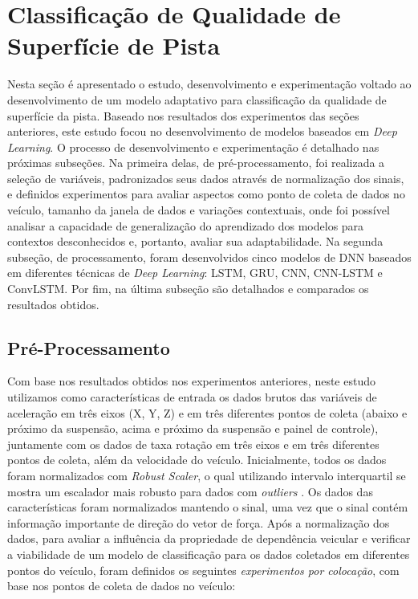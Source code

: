 \chapter{Classificação de Qualidade de Superfície de Pista}
\label{cap:classificacao_qualidade}

Nesta seção é apresentado o estudo, desenvolvimento e experimentação voltado ao desenvolvimento de um modelo adaptativo para classificação da qualidade de superfície da pista. Baseado nos resultados dos experimentos das seções anteriores, este estudo focou no desenvolvimento de modelos baseados em \textit{Deep Learning}. O processo de desenvolvimento e experimentação é detalhado nas próximas subseções. Na primeira delas, de pré-processamento, foi realizada a seleção de variáveis, padronizados seus dados através de normalização dos sinais, e definidos experimentos para avaliar aspectos como ponto de coleta de dados no veículo, tamanho da janela de dados e variações contextuais, onde foi possível analisar a capacidade de generalização do aprendizado dos modelos para contextos desconhecidos e, portanto, avaliar sua adaptabilidade. Na segunda subseção, de processamento, foram desenvolvidos cinco modelos de DNN baseados em diferentes técnicas de \textit{Deep Learning}: LSTM, GRU, CNN, CNN-LSTM e ConvLSTM. Por fim, na última subseção são detalhados e comparados os resultados obtidos.

\section{Pré-Processamento}

Com base nos resultados obtidos nos experimentos anteriores, neste estudo utilizamos como características de entrada os dados brutos das variáveis de aceleração em três eixos (X, Y, Z) e em três diferentes pontos de coleta (abaixo e próximo da suspensão, acima e próximo da suspensão e painel de controle), juntamente com os dados de taxa rotação em três eixos e em três diferentes pontos de coleta, além da velocidade do veículo. Inicialmente, todos os dados foram normalizados com \textit{Robust Scaler}, o qual utilizando intervalo interquartil se mostra um escalador mais robusto para dados com \textit{outliers} \cite{Vaitheeshwari2019}. Os dados das características foram normalizados mantendo o sinal, uma vez que o sinal contém informação importante de direção do vetor de força. Após a normalização dos dados, para avaliar a influência da propriedade de dependência veicular e verificar a viabilidade de um modelo de classificação para os dados coletados em diferentes pontos do veículo, foram definidos os seguintes \emph{experimentos por colocação}, com base nos pontos de coleta de dados no veículo:

